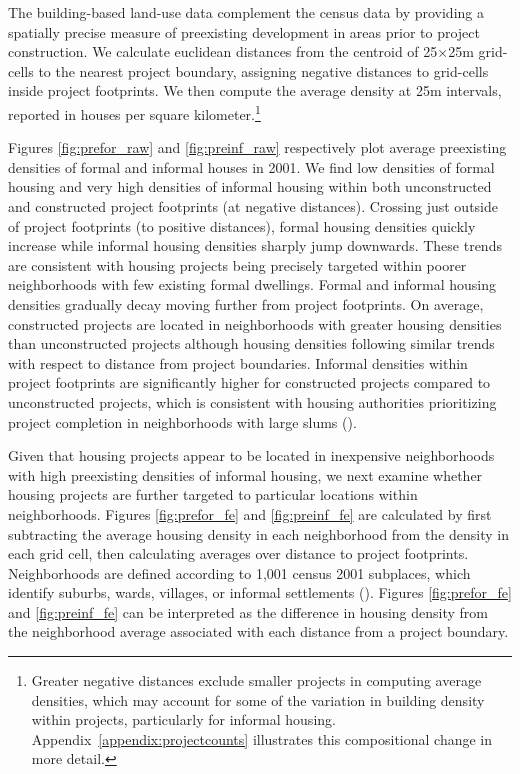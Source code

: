 \documentclass[12pt]{article}
\begin{document}

The building-based land-use data complement the census data by providing a spatially precise measure of preexisting development in areas prior to project construction.  We calculate euclidean distances from the centroid of 25$\times$25m grid-cells to the nearest project boundary, assigning negative distances to grid-cells inside project footprints.  We then compute the average density at 25m intervals, reported in houses per square kilometer.\footnote{Greater negative distances exclude smaller projects in computing average densities, which may account for some of the variation in building density within projects, particularly for informal housing.  Appendix~\ref{appendix:projectcounts} illustrates this compositional change in more detail.} 

Figures \ref{fig:prefor_raw} and \ref{fig:preinf_raw} respectively plot average preexisting densities of formal and informal houses in 2001. We find low densities of formal housing and very high densities of informal housing within both unconstructed and constructed project footprints (at negative distances).  Crossing just outside of project footprints (to positive distances), formal housing densities quickly increase while informal housing densities sharply jump downwards.  These trends are consistent with housing projects being precisely targeted within poorer neighborhoods with few existing formal dwellings.  Formal and informal housing densities gradually decay moving further from project footprints.  On average, constructed projects are located in neighborhoods with greater housing densities than unconstructed projects although housing densities following similar trends with respect to distance from project boundaries.  Informal densities within project footprints are significantly higher for constructed projects compared to unconstructed projects, which is consistent with housing authorities prioritizing project completion in neighborhoods with large slums (\cite{hofmeyr2008risk}).  

Given that housing projects appear to be located in inexpensive neighborhoods with high preexisting densities of informal housing, we next examine whether housing projects are further targeted to particular locations within neighborhoods.  Figures \ref{fig:prefor_fe} and \ref{fig:preinf_fe} are calculated by first subtracting the average housing density in each neighborhood from the density in each grid cell, then calculating averages over distance to project footprints.  Neighborhoods are defined according to 1,001 census 2001 subplaces, which identify suburbs, wards, villages, or informal settlements (\cite{censusmeta}).  Figures \ref{fig:prefor_fe} and \ref{fig:preinf_fe} can be interpreted as the difference in housing density from the neighborhood average associated with each distance from a project boundary.  
\end{document}
